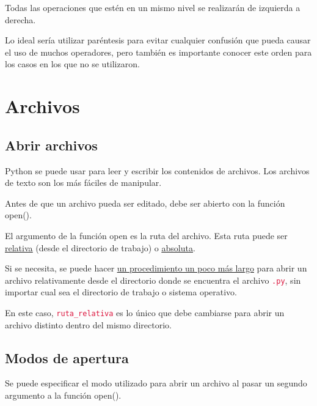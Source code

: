 \documentclass{report}
\newcommand{\link}[2]{\href{#1}{\underline{#2}}}
\newcommand{\ttt}[1]{\textcolor{Crimson}{\texttt{#1}}}
\begin{document}
Todas las operaciones que estén en un mismo nivel se realizarán de izquierda a derecha.\smallskip

Lo ideal sería utilizar paréntesis para evitar cualquier confusión que pueda causar el uso de muchos operadores, pero también es importante conocer este orden para los casos en los que no se utilizaron.

\clearpage\chapter{Archivos}


\section{Abrir archivos}

Python se puede usar para leer y escribir los contenidos de archivos. Los archivos de texto son los más fáciles de manipular.\smallskip

Antes de que un archivo pueda ser editado, debe ser abierto con la función open().


El argumento de la función open es la ruta del archivo. Esta ruta puede ser \link{https://www.discoduroderoer.es/rutas-relativas-y-absolutas/}{relativa} (desde el directorio de trabajo) o \link{https://www.discoduroderoer.es/rutas-relativas-y-absolutas/}{absoluta}.\smallskip

Si se necesita, se puede hacer \link{https://stackoverflow.com/questions/7165749/open-file-in-a-relative-location-in-python}{un procedimiento un poco más largo} para abrir un archivo relativamente desde el directorio donde se encuentra el archivo \ttt{.py}, sin importar cual sea el directorio de trabajo o sistema operativo.


En este caso, \ttt{ruta\_relativa} es lo único que debe cambiarse para abrir un archivo distinto dentro del mismo directorio.

\section{Modos de apertura}

Se puede especificar el modo utilizado para abrir un archivo al pasar un segundo argumento a la función open().
\end{document}
